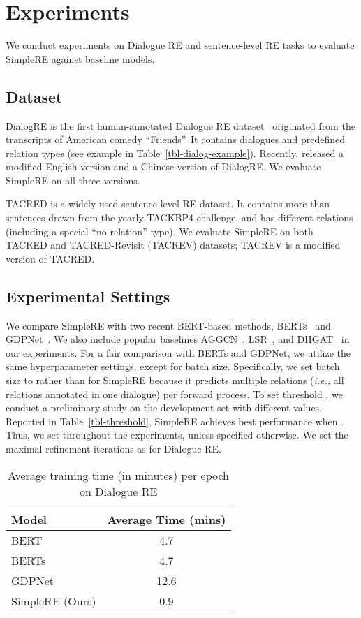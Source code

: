 \documentclass{article}
\newcommand{\ie}{\emph{i.e.,}\xspace}
\begin{document}
\section{Experiments}
We conduct experiments on Dialogue RE and sentence-level RE tasks to evaluate SimpleRE against baseline models. 


\subsection{Dataset}
DialogRE is the first human-annotated Dialogue RE dataset~\cite{yu-etal-2020-dialogue} originated from the transcripts of American comedy ``Friends''. It contains  dialogues and  predefined relation types (see example in Table~\ref{tbl-dialog-example}). Recently, \cite{yu-etal-2020-dialogue} released a modified English version and a Chinese version of DialogRE. We evaluate SimpleRE on all three versions. 

TACRED is a widely-used sentence-level RE dataset. It contains more than  sentences drawn from the yearly TACKBP4 challenge, and has  different relations (including a special ``no relation'' type). We evaluate SimpleRE on both TACRED and TACRED-Revisit (TACREV) datasets; TACREV is a modified version of TACRED. 

\subsection{Experimental Settings}
We compare SimpleRE with two recent BERT-based methods, BERTs~\cite{yu-etal-2020-dialogue} and GDPNet~\cite{xue2020gdpnet}. We also include popular baselines  AGGCN~\cite{guo-etal-2019-attention}, LSR~\cite{nan2020reasoning}, and DHGAT~\cite{chen2020dialogue} in our experiments. For a fair comparison with BERTs and GDPNet, we utilize the same hyperparameter settings, except for batch size. Specifically, we set batch size to  rather than  for SimpleRE because it predicts multiple relations (\ie all relations annotated in one dialogue) per forward process. To set threshold , we conduct a preliminary study on the development set with different  values. Reported in Table~\ref{tbl-threshold}, SimpleRE achieves best performance when . Thus, we set  throughout the experiments, unless specified otherwise. We set the maximal refinement iterations  as  for Dialogue RE. 

\begin{table}[t]
\centering
\small
\caption{Average training time (in minutes)  per epoch on Dialogue RE}
\begin{tabular}{l|c}
\toprule
Model                 & Average Time (mins)             \\ 
\midrule
BERT \cite{devlin-etal-2019-bert}                & 4.7  \\
BERTs \cite{yu-etal-2020-dialogue}     & 4.7     \\
GDPNet \cite{xue2020gdpnet}      & 12.6     \\
SimpleRE (Ours)               & 0.9      \\
\bottomrule
\end{tabular}

\label{tbl-dialogre_time}
\end{table}
\end{document}
